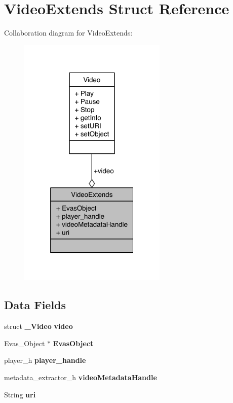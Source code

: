 \section{Video\-Extends Struct Reference}
\label{structVideoExtends}


Collaboration diagram for Video\-Extends\-:\nopagebreak
\begin{figure}[H]
\begin{center}
\leavevmode
\includegraphics[width=200pt]{structVideoExtends__coll__graph}
\end{center}
\end{figure}
\subsection*{Data Fields}
\begin{DoxyCompactItemize}
\item 
struct {\bf \-\_\-\-Video} {\bfseries video}\label{structVideoExtends_a4714170e68af888c5ec33071b3eb28dd}

\item 
Evas\-\_\-\-Object $\ast$ {\bfseries Evas\-Object}\label{structVideoExtends_aecddbd5fdf75a4464eaa995a35315751}

\item 
player\-\_\-h {\bfseries player\-\_\-handle}\label{structVideoExtends_a14b1800bc05edc10c91121ca30e08efd}

\item 
metadata\-\_\-extractor\-\_\-h {\bfseries video\-Metadata\-Handle}\label{structVideoExtends_a81a79d68608cff7e5e6597abb2457c66}

\item 
String {\bfseries uri}\label{structVideoExtends_a457a12b9fada6ac0d9d423c6dfb4727c}

\end{DoxyCompactItemize}



